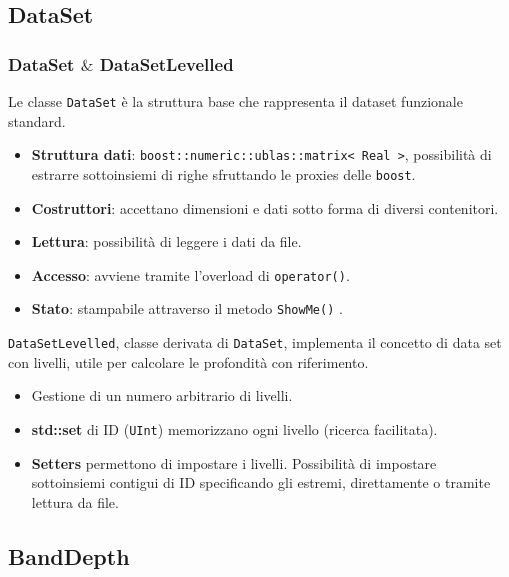 \documentclass[9pt]{beamer}
\begin{document}
\subsection{DataSet}
\begin{frame}
 \frametitle{\ttfamily DataSet $\&$ DataSetLevelled}
Le classe \texttt{DataSet} \`e la struttura base che rappresenta il dataset funzionale standard.\\

\begin{itemize}
 \item \textbf{Struttura dati}: \texttt{boost::numeric::ublas::matrix< Real >}, possibilit\`a di estrarre sottoinsiemi di righe
						  sfruttando le proxies delle \texttt{boost}.
 \item \textbf{Costruttori}: accettano dimensioni e dati sotto forma di diversi contenitori.
 \item \textbf{Lettura}: possibilit\`a di leggere i dati da file.
 \item \textbf{Accesso}: avviene tramite l'overload di \texttt{operator()}.
 \item \textbf{Stato}: stampabile attraverso il metodo \texttt{ShowMe()} .
\end{itemize}
\pause
\texttt{DataSetLevelled}, classe derivata di \texttt{DataSet}, implementa il concetto di data set
con livelli, utile per calcolare le profondit\`a con riferimento.\\
\begin{itemize}
 \item Gestione di un numero arbitrario di livelli.
 \item \textbf{std::set} di ID (\texttt{UInt}) memorizzano ogni livello (ricerca facilitata).
 \item \textbf{Setters} permettono di impostare i livelli. Possibilit\`a di impostare sottoinsiemi contigui di ID specificando gli estremi, direttamente o tramite lettura da file.
\end{itemize}


\end{frame}


\subsection{BandDepth}
\end{document}
